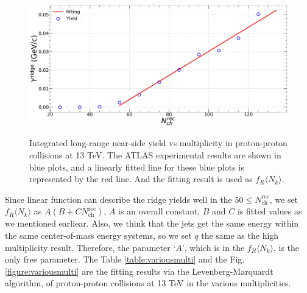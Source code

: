\documentclass[jkps,fleqn,showpacs,showkeys]{revtex4}
\begin{document}
\begin{figure}[ht]
  \centering
  \includegraphics[width=12cm, height=6cm]{./Figures/Yield_Fitting.png}
  \caption{Integrated long-range near-side yield vs multiplicity in proton-proton collisions at 13 TeV.
  The ATLAS experimental results are shown in blue plots\cite{atlas}, and a linearly fitted line for these blue plots is represented by the red line.
  And the fitting result is used as $f_R \langle N_k \rangle$.
  }
  \label{figure:frnk_multi}
\end{figure}

Since linear function can describe the ridge yields well in the $50\leq N_{\text{ch}}^{\text{rec}}$, we set $f_R \langle N_k \rangle$ as $A(B+C N_{\text{ch}}^{\text{rec}})$, $A$ is an overall constant, $B$ and $C$ is fitted values as we mentioned earliear.
Also, we think that the jets get the same energy within the same center-of-mass energy systems, so we set $q$ the same as the high multiplicity result.
Therefore, the parameter `$A$', which is in the $f_R \langle N_k \rangle$, is the only free parameter.
The Table \ref{table:variousmulti} and the Fig. \ref{figure:variousmulti} are the fitting results via the Levenberg-Marquardt algorithm, of proton-proton collisions at 13 TeV in the various multiplicities.
\end{document}

